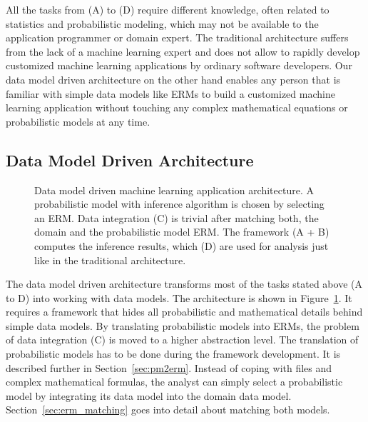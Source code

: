 All the tasks from (A) to (D) require different knowledge, often related to statistics and probabilistic modeling, which may not be available to the application programmer or domain expert. The traditional architecture suffers from the lack of a machine learning expert and does not allow to rapidly develop customized machine learning applications by ordinary software developers. Our data model driven architecture on the other hand enables any person that is familiar with simple data models like ERMs to build a customized machine learning application without touching any complex mathematical equations or probabilistic models at any time.

\newpage %

\subsection{Data Model Driven Architecture}

\begin{figure}
\centering
\scalebox{\tikzScale}{\adjustTikzSize }
\caption[Data model driven machine learning application architecture]{Data model driven machine learning application architecture. A probabilistic model with inference algorithm is chosen by selecting an ERM. Data integration (C) is trivial after matching both, the domain and the probabilistic model ERM. The framework (A + B) computes the inference results, which (D) are used for analysis just like in the traditional architecture.}\label{fig:ml-application-architecture-dm}
\end{figure}

The data model driven architecture transforms most of the tasks stated above (A to D) into working with data models. The architecture is shown in Figure~\ref{fig:ml-application-architecture-dm}. It requires a framework that hides all probabilistic and mathematical details behind simple data models. By translating probabilistic models into ERMs, the problem of data integration (C) is moved to a higher abstraction level. The translation of probabilistic models has to be done during the framework development. It is described further in Section~\ref{sec:pm2erm}. Instead of coping with files and complex mathematical formulas, the analyst can simply select a probabilistic model by integrating its data model into the domain data model. Section~\ref{sec:erm_matching} goes into detail about matching both models.

